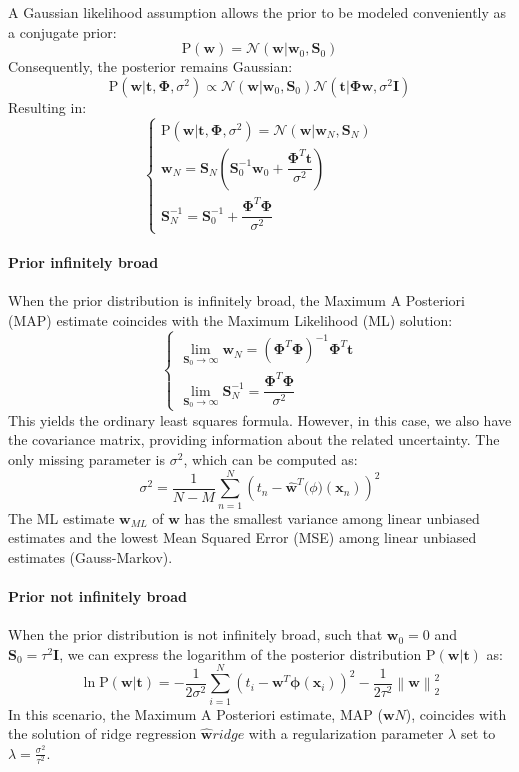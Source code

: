 A Gaussian likelihood assumption allows the prior to be modeled conveniently as a conjugate prior:
\[\text{P}(\textbf{w})=\mathcal{N}(\textbf{w}|\textbf{w}_0,\textbf{S}_0)\]
Consequently, the posterior remains Gaussian:
\[\text{P}(\textbf{w}|\textbf{t},\boldsymbol{\Phi},\sigma^2)\varpropto \mathcal{N}(\textbf{w}|\textbf{w}_0,\textbf{S}_0)\mathcal{N}(\textbf{t}|\boldsymbol{\Phi}\textbf{w},\sigma^2\textbf{I})\]
Resulting in:
\[\begin{cases}
    \text{P}(\textbf{w}|\textbf{t},\boldsymbol{\Phi},\sigma^2)=\mathcal{N}(\textbf{w}|\textbf{w}_N,\textbf{S}_N) \\
    \textbf{w}_N=\textbf{S}_N\left(\textbf{S}_0^{-1}\textbf{w}_0+\dfrac{\boldsymbol{\Phi}^T\textbf{t}}{\sigma^2}\right) \\
    \textbf{S}_N^{-1}=\textbf{S}_0^{-1}+\dfrac{\boldsymbol{\Phi}^T\boldsymbol{\Phi}}{\sigma^2}
\end{cases}\]

\paragraph*{Prior infinitely broad}
When the prior distribution is infinitely broad, the Maximum A Posteriori (MAP) estimate coincides with the Maximum Likelihood (ML) solution:
\[\begin{cases}
    \lim_{\textbf{S}_0\rightarrow\infty}\textbf{w}_N={\left( \boldsymbol{\Phi}^T\boldsymbol{\Phi} \right)}^{-1}\boldsymbol{\Phi}^T\textbf{t} \\
    \lim_{\textbf{S}_0\rightarrow\infty}\textbf{S}_N^{-1}=\dfrac{\boldsymbol{\Phi}^T\boldsymbol{\Phi}}{\sigma^2}
\end{cases}\]
This yields the ordinary least squares formula.
However, in this case, we also have the covariance matrix, providing information about the related uncertainty.
The only missing parameter is $\sigma^2$, which can be computed as:
\[\sigma^2=\dfrac{1}{N-M}\sum_{n=1}^{N}{\left( t_n-\hat{\textbf{w}}^T\boldsymbol(\phi)(\textbf{x}_n) \right)}^2\]
The ML estimate $\textbf{w}_{ML}$ of $\textbf{w}$ has the smallest variance among linear unbiased estimates and the lowest Mean Squared Error (MSE) among linear unbiased estimates (Gauss-Markov).

\paragraph*{Prior not infinitely broad}
When the prior distribution is not infinitely broad, such that $\textbf{w}_0=0$ and $\textbf{S}_0=\tau^2\textbf{I}$, we can express the logarithm of the posterior distribution $\text{P}(\textbf{w}|\textbf{t})$ as:
\[\ln\text{P}(\textbf{w}|\textbf{t})=-\dfrac{1}{2\sigma^2}\sum_{i=1}^{N}{\left(t_i-\textbf{w}^T\boldsymbol{\phi}(\textbf{x}_i)\right)}^2-\dfrac{1}{2\tau^2}\left\lVert \textbf{w}\right\rVert_2^2 \]
In this scenario, the Maximum A Posteriori estimate, MAP ($\textbf{w}N$), coincides with the solution of ridge regression $\hat{\textbf{w}}{ridge}$ with a regularization parameter $\lambda$ set to $\lambda=\frac{\sigma^2}{\tau^2}$.

